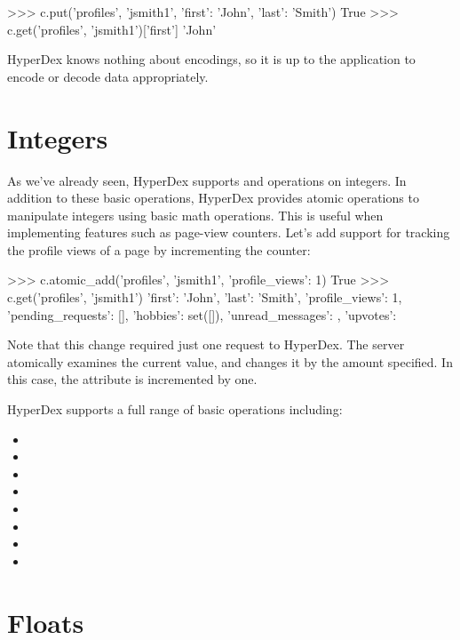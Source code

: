 \begin{pythoncode}
>>> c.put('profiles', 'jsmith1', {'first': 'John', 'last': 'Smith'})
True
>>> c.get('profiles', 'jsmith1')['first']
'John'
\end{pythoncode}

HyperDex knows nothing about encodings, so it is up to the application to encode
or decode data appropriately.

\section{Integers}
\label{sec:data-types:integers}

As we've already seen, HyperDex supports  and  operations on
integers.  In addition to these basic operations, HyperDex provides atomic
operations to manipulate integers using basic math operations.  This is useful
when implementing features such as page-view counters.  Let's add support for
tracking the profile views of a page by incrementing the counter:

\begin{pythoncode}
>>> c.atomic_add('profiles', 'jsmith1', {'profile_views': 1})
True
>>> c.get('profiles', 'jsmith1')
{'first': 'John', 'last': 'Smith',
 'profile_views': 1,
 'pending_requests': [],
 'hobbies': set([]),
 'unread_messages': {},
 'upvotes': {}}
\end{pythoncode}

Note that this change required just one request to HyperDex.  The server
atomically examines the current value, and changes it by the amount specified.
In this case, the  attribute is incremented by one.

HyperDex supports a full range of basic operations including:
\begin{itemize}[noitemsep,nolistsep]
\item {}
\item {}
\item {}
\item {}
\item {}
\item {}
\item {}
\item {}
\end{itemize}

\section{Floats}
\label{sec:data-types:floats}

